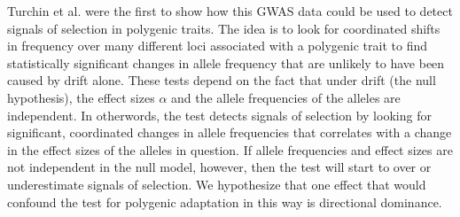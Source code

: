 \documentclass[a4paper,12pt]{article}
\begin{document}
Turchin et al. \cite{heightselection} were the first to show how this
GWAS data could be used to detect signals of selection in polygenic
traits. The idea is to look for coordinated shifts in frequency over
many different loci associated with a polygenic trait to find
statistically significant changes in allele frequency that are
unlikely to have been caused by drift alone. These tests depend on the
fact that under drift (the null hypothesis), the effect sizes $\alpha$
and the allele frequencies of the alleles are independent. In
otherwords, the test detects signals of selection by looking for
significant, coordinated changes in allele frequencies that correlates
with a change in the effect sizes of the alleles in question. If
allele frequencies and effect sizes are not independent in the null
model, however, then the test will start to over or underestimate
signals of selection. We hypothesize that one effect that would
confound the test for polygenic adaptation in this way is directional dominance.
\end{document}
